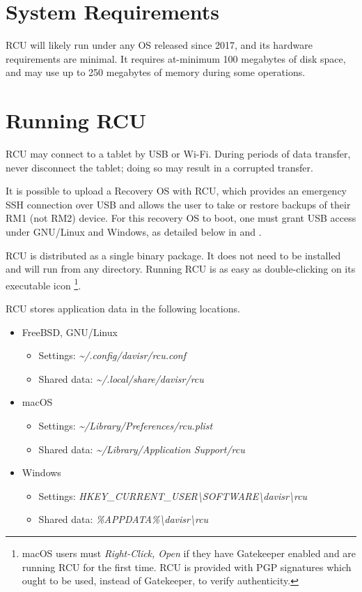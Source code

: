 \documentclass{memoir}
\begin{document}
{\section{System Requirements}
RCU will likely run under any OS released since 2017, and its hardware requirements are minimal. It requires at-minimum 100 megabytes of disk space, and may use up to 250 megabytes of memory during some operations.

\section{Running RCU}
\label{sec:running-rcu}
RCU may connect to a tablet by USB or Wi-Fi. During periods of data transfer, never disconnect the tablet; doing so may result in a corrupted transfer.

It is possible to upload a Recovery OS with RCU, which provides an emergency SSH connection over USB and allows the user to take or restore backups of their RM1 (not RM2) device. For this recovery OS to boot, one must grant USB access under GNU/Linux and Windows, as detailed below in  and .

RCU is distributed as a single binary package. It does not need to be installed and will run from any directory. Running RCU is as easy as double-clicking on its executable icon \footnote{macOS users must \textit{Right-Click, Open} if they have Gatekeeper enabled and are running RCU for the first time. RCU is provided with PGP signatures which ought to be used, instead of Gatekeeper, to verify authenticity.}.

RCU stores application data in the following locations.

\begin{itemize}
\item{FreeBSD, GNU/Linux}
  \begin{itemize}
  \item[]{Settings: \textit{\textasciitilde/.config/davisr/rcu.conf}}
  \item[]{Shared data: \textit{\textasciitilde/.local/share/davisr/rcu}}
  \end{itemize}
\item{macOS}
  \begin{itemize}
    \item[]{Settings: \textit{\textasciitilde/Library/Preferences/rcu.plist}}
    \item[]{Shared data: \textit{\textasciitilde/Library/Application Support/rcu}}
  \end{itemize}
\item{Windows}
  \begin{itemize}
  \item[]{Settings: \textit{HKEY\_CURRENT\_USER\textbackslash SOFTWARE\textbackslash davisr\textbackslash rcu}}
  \item[]{Shared data: \textit{\%APPDATA\%\textbackslash davisr\textbackslash rcu}}
  \end{itemize}
\end{itemize}

}
\end{document}
